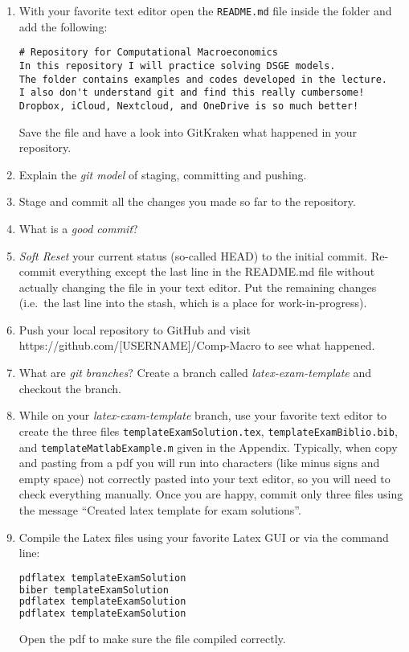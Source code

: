 \begin{enumerate}
\item
With your favorite text editor open the \texttt{README.md} file inside the folder and add the following:
\begin{lstlisting}[basicstyle=\scriptsize\mlttfamily]
# Repository for Computational Macroeconomics
In this repository I will practice solving DSGE models.
The folder contains examples and codes developed in the lecture.
I also don't understand git and find this really cumbersome!
Dropbox, iCloud, Nextcloud, and OneDrive is so much better!
\end{lstlisting}
Save the file and have a look into GitKraken what happened in your repository.

\item
Explain the \emph{git model} of staging, committing and pushing.

\item
Stage and commit all the changes you made so far to the repository.

\item
What is a \emph{good commit}?

\item
\emph{Soft Reset} your current status (so-called HEAD) to the initial commit.
Re-commit everything except the last line in the README.md file without actually changing the file in your text editor.
Put the remaining changes (i.e.\ the last line into the stash, which is a place for work-in-progress).

\item
Push your local repository to GitHub and visit https://github.com/[USERNAME]/Comp-Macro to see what happened.

\item
What are \emph{git branches}?
Create a branch called \emph{latex-exam-template} and checkout the branch.

\item
While on your \emph{latex-exam-template} branch, use your favorite text editor
  to create the three files \texttt{templateExamSolution.tex}, \texttt{templateExamBiblio.bib}, and \texttt{templateMatlabExample.m} given in the Appendix.
Typically, when copy and pasting from a pdf you will run into characters (like minus signs and empty space) not correctly pasted into your text editor,
  so you will need to check everything manually.
Once you are happy, commit only three files using the message \enquote{Created latex template for exam solutions}.

\item
Compile the Latex files using your favorite Latex GUI or via the command line:
\begin{lstlisting}[language=tex,frame=single,basicstyle=\scriptsize\mlttfamily]
pdflatex templateExamSolution
biber templateExamSolution
pdflatex templateExamSolution
pdflatex templateExamSolution
\end{lstlisting}
Open the pdf to make sure the file compiled correctly.


\end{enumerate}
